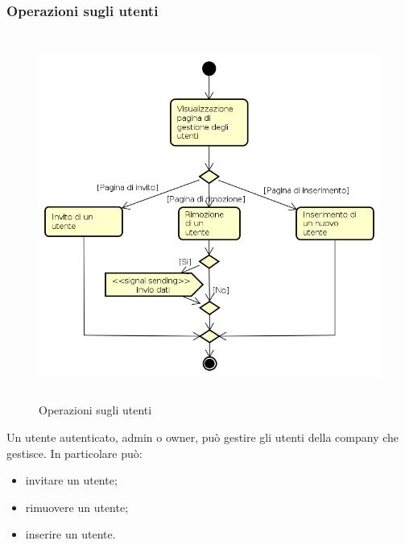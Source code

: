 \subsubsection{Operazioni sugli utenti}
\begin{figure}[H]
\begin{center}
\includegraphics[height=12cm]{res/sections/backend/activities/gestioneUtenti.png}
\caption{Operazioni sugli utenti}
\end{center}
\end{figure}
Un utente autenticato, admin o owner, può gestire gli utenti della company che gestisce. In particolare può:
\begin{itemize}
\item invitare un utente;
\item rimuovere un utente;
\item inserire un utente.
\end{itemize}
